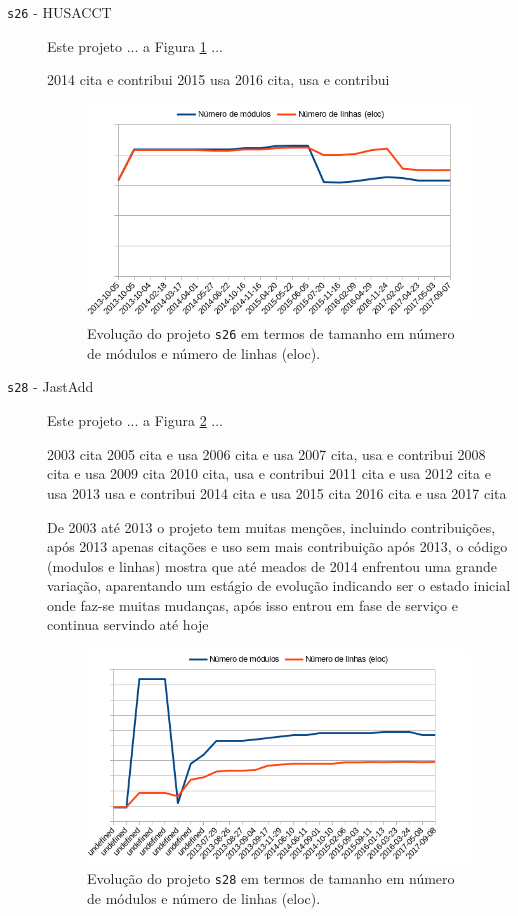 \begin{description}
  \item[\texttt{s26} - HUSACCT]
    Este projeto ... a Figura \ref{modules-eloc-s26} ...

2014	cita e contribui
2015	usa
2016	cita, usa e contribui

\begin{figure}[h]
  \centering
  \includegraphics[scale=0.6]{imagens/modules-eloc-s26.png}
  \caption{Evolução do projeto \texttt{s26} em termos de tamanho em número de módulos e número de linhas (eloc).}
  \label{modules-eloc-s26}
\end{figure}

  \item[\texttt{s28} - JastAdd]
    Este projeto ... a Figura \ref{modules-eloc-s28} ...

2003	cita
2005	cita e usa
2006	cita e usa
2007	cita, usa e contribui
2008	cita e usa
2009	cita
2010	cita, usa e contribui
2011	cita e usa
2012	cita e usa
2013	usa e contribui
2014	cita e usa
2015	cita
2016	cita e usa
2017	cita

De 2003 até 2013 o projeto tem muitas menções, incluindo contribuições, após 2013 apenas citações e uso
sem mais contribuição após 2013, o código (modulos e linhas) mostra que até meados de 2014 enfrentou
uma grande variação, aparentando um estágio de evolução indicando ser o estado inicial onde faz-se muitas
mudanças, após isso entrou em fase de serviço e continua servindo até hoje

\begin{figure}[h]
  \centering
  \includegraphics[scale=0.6]{imagens/modules-eloc-s28.png}
  \caption{Evolução do projeto \texttt{s28} em termos de tamanho em número de módulos e número de linhas (eloc).}
  \label{modules-eloc-s28}
\end{figure}


\end{description}
